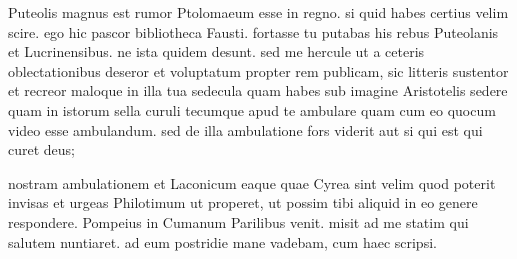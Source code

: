 


 Puteolis magnus est rumor Ptolomaeum esse in regno. si quid habes certius velim scire. ego hic pascor bibliotheca Fausti. fortasse tu putabas his rebus Puteolanis et Lucrinensibus. ne ista quidem desunt. sed me hercule ut a ceteris oblectationibus deseror et voluptatum propter rem publicam, sic litteris sustentor et recreor maloque in illa tua sedecula quam habes sub imagine Aristotelis sedere quam in istorum sella curuli tecumque apud te ambulare quam cum eo quocum video esse ambulandum. sed de illa ambulatione fors viderit aut si qui est qui curet deus;

 nostram ambulationem et Laconicum eaque quae Cyrea sint velim quod poterit invisas et urgeas Philotimum ut properet, ut possim tibi aliquid in eo genere respondere. Pompeius in Cumanum Parilibus venit. misit ad me statim qui salutem nuntiaret. ad eum postridie mane vadebam, cum haec scripsi.
